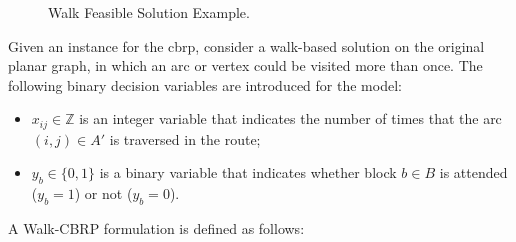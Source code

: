 \begin{figure}[h!]
\begin{minipage}[c]{.4\textwidth}
	\end{minipage}
	\caption{\label{fig:walk-feasible-solution-example} Walk Feasible Solution Example.}
\end{figure}

Given an instance for the \gls{cbrp}, consider a walk-based solution on the
original planar graph, in which an arc or vertex could be visited more than
once. The following binary decision variables are introduced for the model:

\begin{itemize}
	\item $x_{ij} \in \mathbb{Z}$ is an integer variable that indicates the number of times that the arc $(i, j) \in A'$ is traversed in the route;
	\item $y_{b} \in \{0, 1\}$ is a binary variable that indicates whether block $b \in B$ is attended ($y_{b} = 1$) or not ($y_{b} = 0$).
\end{itemize}

A Walk-CBRP formulation is defined as follows:

